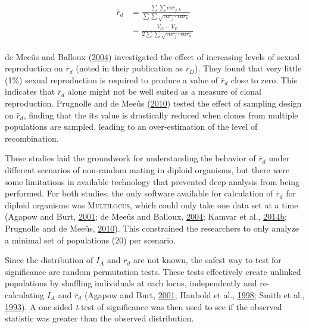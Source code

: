 \documentclass[double,12pt]{beavtex}
\begin{document}
  \begin{align} %
  \begin{split} %
  \bar{r}_d &= \frac{\sum\sum{cov_{j,k}}}{
                     \sum\sum{\sqrt{var_{j} \cdot var_{k}}}} \\
            &= \frac{V_O - V_E}{2\sum\sum{\sqrt{var_{j} \cdot var_{k}}}}
  \end{split}
  \label{eq:rd}
  \end{align}
  
  de Meeûs and Balloux (\protect\hyperlink{ref-de2004clonal}{2004})
  investigated the effect of increasing levels of sexual reproduction on
  \(\bar{r}_d\) (noted in their publication as \(\bar{r}_D\)). They found
  that very little (1\%) sexual reproduction is required to produce a
  value of \(\bar{r}_d\) close to zero. This indicates that \(\bar{r}_d\)
  alone might not be well suited as a measure of clonal reproduction.
  Prugnolle and de Meeûs
  (\protect\hyperlink{ref-prugnolle2010apparent}{2010}) tested the effect
  of sampling design on \(\bar{r}_d\), finding that the its value is
  drastically reduced when clones from multiple populations are sampled,
  leading to an over-estimation of the level of recombination.
  
  These studies laid the groundwork for understanding the behavior of
  \(\bar{r}_d\) under different scenarios of non-random mating in diploid
  organisms, but there were some limitations in available technology that
  prevented deep analysis from being performed. For both studies, the only
  software available for calculation of \(\bar{r}_d\) for diploid
  organisms was \textsc{Multilocus}, which could only take one data set at
  a time (Agapow and Burt, \protect\hyperlink{ref-Agapow_2001}{2001}; de
  Meeûs and Balloux, \protect\hyperlink{ref-de2004clonal}{2004}; Kamvar et
  al.,
  \protect\hyperlink{ref-kamvar2014poppr}{2014}\protect\hyperlink{ref-kamvar2014poppr}{b};
  Prugnolle and de Meeûs,
  \protect\hyperlink{ref-prugnolle2010apparent}{2010}). This constrained
  the researchers to only analyze a minimal set of populations (20) per
  scenario.
  
  Since the distribution of \(I_A\) and \(\bar{r}_d\) are not known, the
  safest way to test for significance are random permutation tests. These
  tests effectively create unlinked populations by shuffling individuals
  at each locus, independently and re-calculating \(I_A\) and
  \(\bar{r}_d\) (Agapow and Burt,
  \protect\hyperlink{ref-Agapow_2001}{2001}; Haubold et al.,
  \protect\hyperlink{ref-haubold1998detecting}{1998}; Smith et al.,
  \protect\hyperlink{ref-smith1993how}{1993}). A one-sided \emph{t}-test
  of significance was then used to see if the observed statistic was
  greater than the observed distribution.
  
\end{document}
